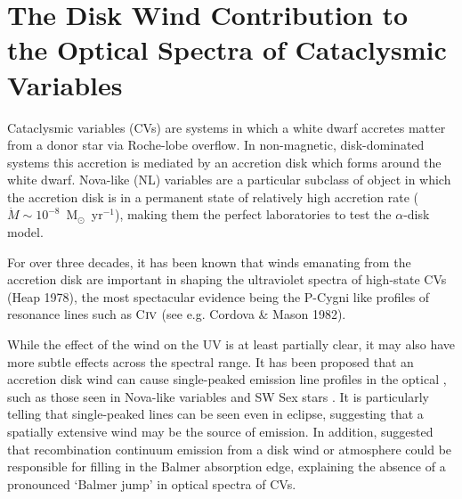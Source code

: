 \documentclass[useAMS,usenatbib,onecolumn]{mn2e2}
\begin{document}





%
%


\section{The Disk Wind Contribution to the Optical Spectra of Cataclysmic Variables}

Cataclysmic variables (CVs) are systems in which a white dwarf accretes matter from a donor
star via Roche-lobe overflow. In non-magnetic, disk-dominated systems this accretion
is mediated by an accretion disk which forms around the white dwarf. 
Nova-like (NL) variables are a particular subclass of object in which the accretion disk
is in a permanent state of relatively high accretion rate 
($\dot{M} \sim 10^{-8}$~M$_{\odot}$~yr$^{-1}$), making them the perfect laboratories to 
test the $\alpha$-disk model.

For over three decades, it has been known that winds emanating from the accretion disk
are important in shaping the ultraviolet spectra of high-state CVs (Heap 1978), 
the most spectacular evidence being the P-Cygni like profiles of resonance lines such as 
C${\textsc {iv}}$ (see e.g. Cordova \& Mason 1982\nocite{cordova1982}).

While the effect of the wind on the UV is at least partially clear, it may also have more subtle 
effects across the spectral range. It has been proposed that an accretion disk wind
can cause single-peaked emission line profiles in the optical \citep{MC96}, 
such as those seen in Nova-like variables and SW Sex stars \citep{HSK86, DR95}.
It is particularly telling that single-peaked lines can be seen even in eclipse, suggesting 
that a spatially extensive wind may be the source of emission.
In addition, \cite{KLWB98} suggested
that recombination continuum emission from a disk wind or atmosphere
could be responsible for filling in the Balmer absorption edge, explaining 
the absence of a pronounced `Balmer jump' in optical spectra of CVs.
\end{document}

